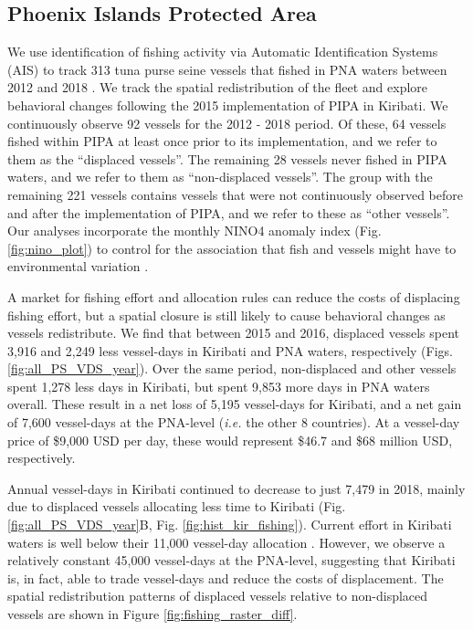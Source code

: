 \documentclass[12pt]{article}
\begin{document}
\subsection{Phoenix Islands Protected Area}

We use identification of fishing activity via Automatic Identification Systems (AIS) to track 313 tuna purse seine vessels that fished in PNA waters between 2012 and 2018 \cite{mccauley_2016,kroodsma_2018}. We track the spatial redistribution of the fleet and explore behavioral changes following the 2015 implementation of PIPA in Kiribati. We continuously observe 92 vessels for the 2012 - 2018 period. Of these, 64 vessels fished within PIPA at least once prior to its implementation, and we refer to them as the ``displaced vessels''. The remaining 28 vessels never fished in PIPA waters, and we refer to them as ``non-displaced vessels''. The group with the remaining 221 vessels contains vessels that were not continuously observed before and after the implementation of PIPA, and we refer to these as ``other vessels''. Our analyses incorporate the monthly NINO4 anomaly index (Fig. \ref{fig:nino_plot}) to control for the association that fish and vessels might have to environmental variation \cite{lehodey_1997,kroodsma_2018,aqorau_2018}.

A market for fishing effort and allocation rules can reduce the costs of displacing fishing effort, but a spatial closure is still likely to cause behavioral changes as vessels redistribute. We find that between 2015 and 2016, displaced vessels spent 3,916 and 2,249 less vessel-days in Kiribati and PNA waters, respectively (Figs. \ref{fig:all_PS_VDS_year}). Over the same period, non-displaced and other vessels spent 1,278 less days in Kiribati, but spent 9,853 more days in PNA waters overall. These result in a net loss of 5,195 vessel-days for Kiribati, and a net gain of 7,600 vessel-days at the PNA-level (\emph{i.e.} the other 8 countries). At a vessel-day price of \$9,000 USD per day, these would represent \$46.7 and \$68 million USD, respectively.

Annual vessel-days in Kiribati continued to decrease to just 7,479 in 2018, mainly due to displaced vessels allocating less time to Kiribati (Fig. \ref{fig:all_PS_VDS_year}B, Fig. \ref{fig:hist_kir_fishing}). Current effort in Kiribati waters is well below their 11,000 vessel-day allocation \cite{yeeting2018stabilising}. However, we observe a relatively constant 45,000 vessel-days at the PNA-level, suggesting that Kiribati is, in fact, able to trade vessel-days and reduce the costs of displacement. The spatial redistribution patterns of displaced vessels relative to non-displaced vessels are shown in Figure \ref{fig:fishing_raster_diff}.
\end{document}
